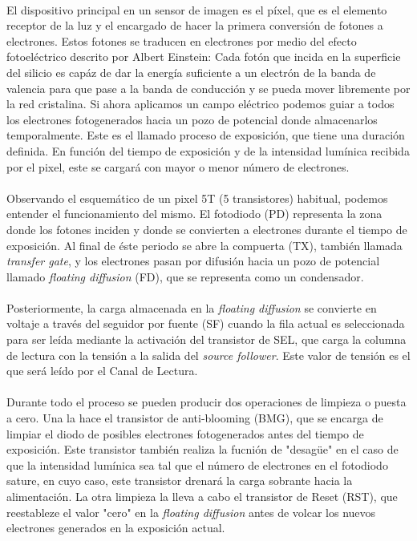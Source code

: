 \paragraph{}
El dispositivo principal en un sensor de imagen es el píxel, que es el elemento
receptor de la luz y el encargado de hacer la primera conversión de fotones a
electrones. Estos fotones se traducen en electrones por medio del efecto fotoeléctrico
descrito por Albert Einstein: Cada fotón que incida en la superficie del silicio
es capáz de dar la energía suficiente a un electrón de la banda de valencia para que
pase a la banda de conducción y se pueda mover libremente por la red cristalina.
Si ahora aplicamos un campo eléctrico podemos guiar a todos los electrones
fotogenerados hacia un pozo de potencial donde almacenarlos temporalmente. Este
es el llamado proceso de exposición, que tiene una duración definida. En función
del tiempo de exposición y de la intensidad lumínica recibida por el pixel, este
se cargará con mayor o menor número de electrones.

\paragraph{}
Observando el esquemático de un pixel 5T (5 transistores) habitual, podemos entender
el funcionamiento del mismo. El fotodiodo (PD) representa la zona donde los fotones
inciden y donde se convierten a electrones durante el tiempo de exposición. Al final
de éste periodo se abre la compuerta (TX), también llamada \textit{transfer gate},
y los electrones pasan por difusión hacia un pozo de potencial llamado \textit{floating
diffusion} (FD), que se representa como un condensador.

\paragraph{}
Posteriormente, la carga almacenada en la \textit{floating diffusion} se convierte
en voltaje a través del seguidor por fuente (SF) cuando la fila actual es seleccionada
para ser leída mediante la activación del transistor de SEL, que carga la columna
de lectura con la tensión a la salida del \textit{source follower}. Este valor de
tensión es el que será leído por el Canal de Lectura.

\paragraph{}
Durante todo el proceso
se pueden producir dos operaciones de limpieza o puesta a cero. Una la hace el
transistor de anti-blooming (BMG), que se encarga de limpiar el diodo de posibles
electrones fotogenerados antes del tiempo de exposición. Este transistor también
realiza la fucnión de "desagüe" en el caso de que la intensidad lumínica sea tal
que el número de electrones en el fotodiodo sature, en cuyo caso, este transistor
drenará la carga sobrante hacia la alimentación. La otra limpieza la
lleva a cabo el transistor de Reset (RST), que reestableze el valor "cero" en la
 \textit{floating diffusion} antes de volcar los nuevos electrones generados en
 la exposición actual.





